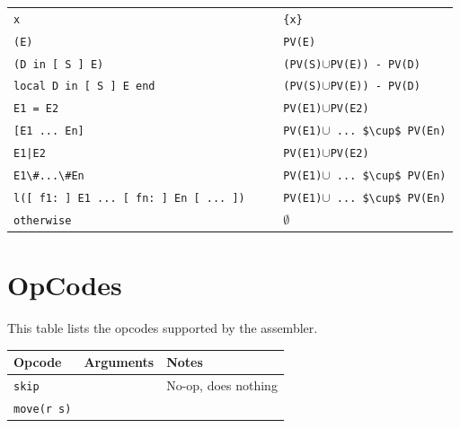 \documentclass[a4paper]{memoir}
\begin{document}
\begin{appendices}
\begin{tabular} {l l}
\lstinline!x                                       ! & \lstinline!{x} !                                   \\
\lstinline!(E)                                     ! & \lstinline!PV(E) !                                    \\
\lstinline!(D in [ S ] E)                          ! & \lstinline[mathescape]!(PV(S)!$\cup$\lstinline!PV(E)) - PV(D) !\\
\lstinline!local D in [ S ] E end                  ! & \lstinline[mathescape]!(PV(S)!$\cup$\lstinline!PV(E)) - PV(D) !\\
\lstinline!E1 = E2                                 ! & \lstinline[mathescape]!PV(E1)!$\cup$\lstinline!PV(E2)         !\\
\lstinline![E1 ... En]                             ! & \lstinline[mathescape]!PV(E1)!$\cup$\lstinline[mathescape]! ... $\cup$ PV(En)!\\
\lstinline!E1|E2                                   ! & \lstinline[mathescape]!PV(E1)!$\cup$\lstinline!PV(E2)         !\\
\lstinline!E1\#...\#En                             ! & \lstinline[mathescape]!PV(E1)!$\cup$\lstinline[mathescape]! ... $\cup$ PV(En)!\\
\lstinline!l([ f1: ] E1 ... [ fn: ] En [ ... ])    ! & \lstinline[mathescape]!PV(E1)!$\cup$\lstinline[mathescape]! ... $\cup$ PV(En)!\\
\lstinline!otherwise                               ! &              $\emptyset$                               \\
\end{tabular}

\openany

\chapter{OpCodes}\label{appendix:opcodes}
This table lists the opcodes supported by the assembler. \\

\begin{tabular} {p{4cm}p{4cm}p{5cm}}
Opcode & Arguments& Notes \\
\hline
\lstinline!skip! & & No-op, does nothing\\

\hline 
\lstinline!move(r s)! & 


\end{tabular}
\end{appendices}
\end{document}
